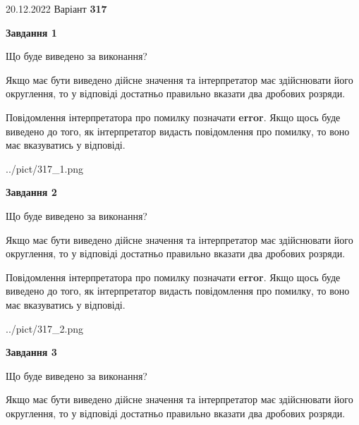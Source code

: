 \documentclass[12pt, ukrainian]{article}
\begin{document}
{20.12.2022 Варіант \No \textbf { 317 }\par}
{
\begin {Large}

{\begin {center}\textbf{Завдання 1}\end {center}}\par
Що буде виведено за виконання? \par

Якщо має бути виведено дійсне значення та інтерпретатор має здійснювати його округлення, 
то у відповіді достатньо правильно вказати два дробових розряди.

Повідомлення інтерпретатора про помилку позначати \textbf{error}.
Якщо щось буде виведено до того, як інтерпретатор видасть повідомлення про помилку, 
то воно має вказуватись у відповіді. \par

\begin{center}
	{../pict/317_1.png}
\end{center}
\newpage

{\begin {center}\textbf{Завдання 2}\end {center}}\par
Що буде виведено за виконання? \par

Якщо має бути виведено дійсне значення та інтерпретатор має здійснювати його округлення, 
то у відповіді достатньо правильно вказати два дробових розряди.

Повідомлення інтерпретатора про помилку позначати \textbf{error}.
Якщо щось буде виведено до того, як інтерпретатор видасть повідомлення про помилку, 
то воно має вказуватись у відповіді. \par

\begin{center}
	{../pict/317_2.png}
\end{center}
\newpage

{\begin {center}\textbf{Завдання 3}\end {center}}\par
Що буде виведено за виконання? \par

Якщо має бути виведено дійсне значення та інтерпретатор має здійснювати його округлення, 
то у відповіді достатньо правильно вказати два дробових розряди.


\end{Large}}
\end{document}
